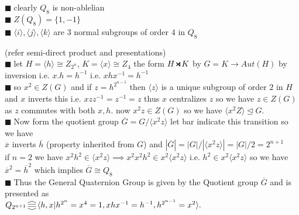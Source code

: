 \documentclass[11pt]{extarticle}
\newcommand{\ra}{\rightarrow}
\newcommand{\y}{$\blacksquare\;$}
\newcommand{\smdp}{ \,
\begin{tikzpicture}
	\draw[thick] (0,0)--(1ex,1ex)--(1ex,0)--(0,1ex);
\end{tikzpicture} 
\,
}
\newcommand{\gen}[1]{\langle #1 \rangle}
\newcommand{\pst}{ \,\rotatebox[origin=c]{90}{$ \gen{||} $} \,}
\newcommand{\tbx}[2][]{
	\begin{tcolorbox}[enhanced,breakable,size=small,colback=black!2!white,title={#1},arc is angular, arc=1.5mm,drop fuzzy shadow]
		#2
	\end{tcolorbox}
}
\begin{document}
\begin{multicols}{2}
{\begin{center}
\end{center}
}
\tbx{ 
\y clearly $ Q_8 $ is non-ablelian\\
\y $ Z(Q_8)=\{1,-1\} $ \\
 \y $\gen{i},\gen{j},\gen{k}$ are 3 normal subgroups of order $ 4 $ in $ Q_8 $ }
 \tbx[Generalised Quaternion Group ]{ (refer semi-direct product and presentations)\\
 \y let $ H=\gen{h}\cong Z_{2^n} $, $ K=\gen{x}\cong Z_4 $  the form $ H\smdp K $ by $ G= K\ra Aut(H) $ by inversion i.e. $ x.h=h^{-1} $ i.e. $ xhx^{-1}=h^{-1} $ \\
\y so $ x^2\in  Z(G) $  and if $ z=h^{2^{n-1}} $ then $ \gen{z} $ is a unique subgroup of order $ 2 $ in $ H $ and $ x $ inverts this i.e. $ xzz^{-1}=z^{-1}=z $ thus $ x $ centralizes $ z $ so we have $ z\in Z(G) $ as $ z $ commutes with both $ x,h $. now $ x^2z\in Z(G) $ so we have $ \gen{x^2Z}\trianglelefteq G $.\\
 \y Now form the quotient group $ \overline{G}=G/\gen{x^2z}$ let bar indicate this transition so we have\\
 $ \overline{x} $ inverts $ \overline{h} $ (property inherited from $ G $) and $ |\overline{G}|=|G|/|\gen{x^2z}|=|G|/2=2^{n+1} $ \\
 if $ n=2 $ we have $ {x}^2{h}^{2}\in \gen{x^2z}\implies {x}^2{x}^2{h}^{2}\in x^2\gen{x^2z}$ i.e. $ h^2 \in x^2\gen{x^2z}$ so we have $ \overline{x}^2=\overline{h}^2 $ which implies $ \overline{G}\cong Q_8 $ \\
\y Thus the General Quaternion Group is given by the Quotient group $\overline{G}$ and is presented as 
\\ $ Q_{2^{n+1}} \pst \gen{ h,x |h^{2^n}=x^4=1,xhx^{-1}=h^{-1},h^{2^{n-1}}=x^2}.$ 
  } 
  \newcolumn

\end{multicols}
\end{document}
